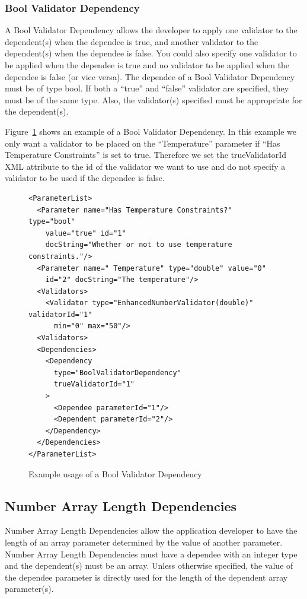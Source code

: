 \subsubsection{Bool Validator Dependency}
A Bool Validator Dependency allows the developer to apply one validator to the dependent(s) when the dependee is true, and another validator
to the dependent(s) when the dependee is false. You could also specify one validator to be applied when the dependee is true and no validator
to be applied when the dependee is false (or vice versa). The dependee of a Bool Validator Dependency must be of type bool. If both a ``true'' and
``false'' validator are specified, they must be of the same type. Also, the validator(s) specified must be appropriate for the dependent(s).

Figure~\ref{BoolValidDepXML} shows an example of a Bool Validator Dependency. In this example we only want a validator to be placed on the
``Temperature'' parameter if ``Has Temperature Constraints'' is set to true. Therefore we set the trueValidatorId XML attribute to the id of the
validator we want to use and do not specify a validator to be used if the dependee is false.
\begin{figure}
\centering
{\footnotesize
\begin{verbatim}
<ParameterList>
  <Parameter name="Has Temperature Constraints?" type="bool" 
    value="true" id="1" 
    docString="Whether or not to use temperature constraints."/>
  <Parameter name=" Temperature" type="double" value="0"
    id="2" docString="The temperature"/>
  <Validators>
    <Validator type="EnhancedNumberValidator(double)" validatorId="1"
      min="0" max="50"/>
  <Validators>
  <Dependencies>
    <Dependency 
      type="BoolValidatorDependency" 
      trueValidatorId="1"
    >
      <Dependee parameterId="1"/>
      <Dependent parameterId="2"/>
    </Dependency>
  </Dependencies>
</ParameterList>
\end{verbatim}
}
\caption{Example usage of a Bool Validator Dependency}
\label{BoolValidDepXML}
\end{figure}

\subsection{Number Array Length Dependencies}
Number Array Length Dependencies allow the application developer to have the length of an array parameter determined by the value of another parameter. Number Array Length
Dependencies must have a dependee with an integer type and the dependent(s) must be an array. Unless otherwise specified, the value of the dependee parameter is directly
used for the length of the dependent array parameter(s). 

